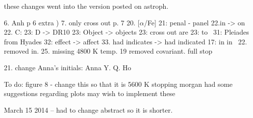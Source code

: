 these changes went into the version posted on astroph. 

6. Anh p 6 extra )
7. only cross out p. 7 
20. [$\alpha$/Fe] 
21: penal - panel 
22.in -> on
22. C: 
23: D -> DR10
23: Object -> objects
23: cross out are
23: \logg to \logg\ 
31: Pleiades from Hyades
32: effect -> affect
33. had indicates -> had indicated
17: in in \logg\
22. removed in.
25. missing 4800 K temp. 
19 removed covariant. full stop

21. change Anna's initials: Anna Y. Q. Ho 

To do: figure 8 - change this so that it is 5600 K stopping
morgan had some suggestions regarding plots may wish to implement these 

March 15 2014
-- had to change abstract so it is shorter. \\
